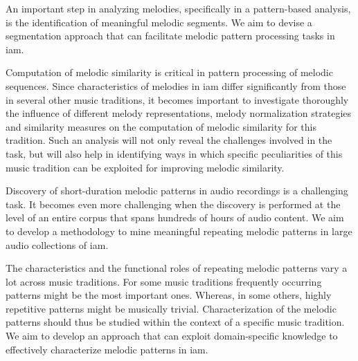 An important step in analyzing melodies, specifically in a pattern-based analysis, is the identification of meaningful melodic segments. We aim to devise a segmentation approach that can facilitate melodic pattern processing tasks in \gls{iam}. 

Computation of melodic similarity is critical in pattern processing of melodic sequences. Since characteristics of melodies in \gls{iam} differ significantly from those in several other music traditions, it becomes important to investigate thoroughly the influence of different melody representations, melody normalization strategies and similarity measures on the computation of melodic similarity for this tradition. Such an analysis will not only reveal the challenges involved in the task, but will also help in identifying ways in which specific peculiarities of this music tradition can be exploited for improving melodic similarity. 

Discovery of short-duration melodic patterns in audio recordings is a challenging task. It becomes even more challenging when the discovery is performed at the level of an entire corpus that spans hundreds of hours of audio content. We aim to develop a methodology to mine meaningful repeating melodic patterns in large audio collections of \gls{iam}. 

The characteristics and the functional roles of repeating melodic patterns vary a lot across music traditions. For some music traditions frequently occurring patterns might be the most important ones. Whereas, in some others, highly repetitive patterns might be musically trivial. Characterization of the melodic patterns should thus be studied within the context of a specific music tradition. We aim to develop an approach that can exploit domain-specific knowledge to effectively characterize melodic patterns in \gls{iam}.

